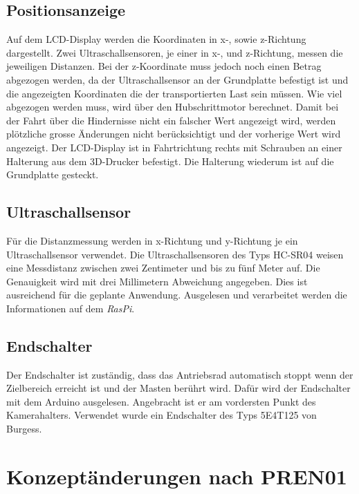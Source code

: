 \documentclass[a4paper]{report}
\begin{document}
\subsection{Positionsanzeige}

Auf dem LCD-Display werden die Koordinaten in x-, sowie z-Richtung dargestellt. Zwei Ultraschallsensoren, je einer in x-, und z-Richtung, messen die jeweiligen Distanzen. Bei der z-Koordinate muss jedoch noch einen Betrag abgezogen werden, da der Ultraschallsensor an der Grundplatte befestigt ist und die angezeigten Koordinaten die der transportierten Last sein müssen. Wie viel abgezogen werden muss, wird über den Hubschrittmotor berechnet. Damit bei der Fahrt über die Hindernisse nicht ein falscher Wert angezeigt wird, werden plötzliche grosse Änderungen nicht berücksichtigt und der vorherige Wert wird angezeigt. Der LCD-Display ist in Fahrtrichtung rechts mit Schrauben an einer Halterung aus dem 3D-Drucker befestigt. Die Halterung wiederum ist auf die Grundplatte gesteckt.


\newpage


\subsection{Ultraschallsensor}
Für die Distanzmessung werden in x-Richtung und y-Richtung je ein Ultraschallsensor verwendet. Die Ultraschallsensoren des Typs HC-SR04 weisen eine Messdistanz zwischen zwei Zentimeter und bis zu fünf Meter auf. Die Genauigkeit wird mit drei Millimetern Abweichung angegeben. Dies ist ausreichend für die geplante Anwendung. Ausgelesen und verarbeitet werden die Informationen auf dem \textit{RasPi}.



\subsection{Endschalter}
Der Endschalter ist zuständig, dass das Antriebsrad automatisch stoppt wenn der Zielbereich erreicht ist und der Masten berührt wird. Dafür wird der Endschalter mit dem Arduino ausgelesen. Angebracht ist er am vordersten Punkt des Kamerahalters. Verwendet wurde ein Endschalter des Typs 5E4T125 von Burgess.


\section{Konzeptänderungen nach PREN01}
\label{sec:Konzeptaenderungen}
\end{document}
